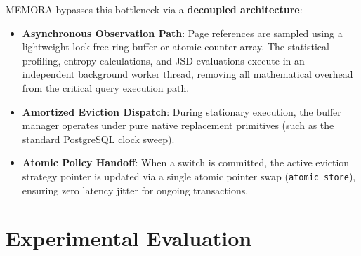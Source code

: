 \documentclass[conference]{IEEEtran}
\begin{document}
MEMORA bypasses this bottleneck via a \textbf{decoupled architecture}:
\begin{itemize}
    \item \textbf{Asynchronous Observation Path}: Page references are sampled using a lightweight lock-free ring buffer or atomic counter array. The statistical profiling, entropy calculations, and JSD evaluations execute in an independent background worker thread, removing all mathematical overhead from the critical query execution path.
    \item \textbf{Amortized Eviction Dispatch}: During stationary execution, the buffer manager operates under pure native replacement primitives (such as the standard PostgreSQL clock sweep).
    \item \textbf{Atomic Policy Handoff}: When a switch is committed, the active eviction strategy pointer is updated via a single atomic pointer swap (\texttt{atomic\_store}), ensuring zero latency jitter for ongoing transactions.
\end{itemize}

\section{Experimental Evaluation}
\end{document}
